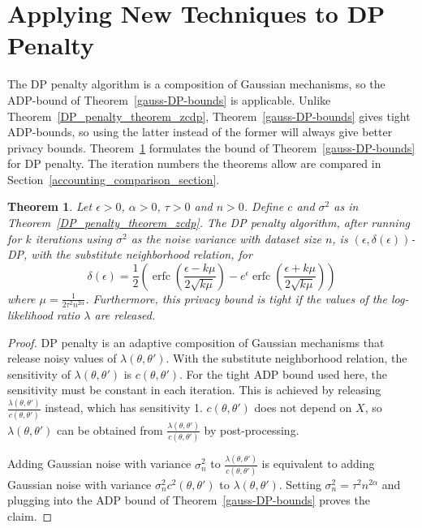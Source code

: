 \documentclass[english,twoside,openright]{HYgraduMLDS}
\newtheorem{theorem}[lemma]{Theorem}
\DeclareMathOperator{\erfc}{erfc}
\begin{document}
\section{Applying New Techniques to DP Penalty}\label{dp_penalty_adp_section}

The DP penalty algorithm is a composition of Gaussian mechanisms, so
the ADP-bound of Theorem~\ref{gauss-DP-bounds} is applicable. Unlike
Theorem~\ref{DP_penalty_theorem_zcdp}, Theorem~\ref{gauss-DP-bounds}
gives tight ADP-bounds, so using the latter instead of the former will
always give better privacy bounds. Theorem~\ref{DP_penalty_theorem_adp}
formulates the bound of Theorem~\ref{gauss-DP-bounds} for DP penalty.
The iteration numbers the theorems allow are compared in
Section~\ref{accounting_comparison_section}.

\begin{theorem}\label{DP_penalty_theorem_adp}
    Let \(\epsilon > 0\), \(\alpha > 0\), \(\tau > 0\) and \(n > 0\).
    Define \(c\) and \(\sigma^{2}\) as in Theorem~\ref{DP_penalty_theorem_zcdp}.
    The DP penalty algorithm, after running for \(k\) iterations using \(\sigma^{2}\)
    as the noise variance with dataset size \(n\),
    is \((\epsilon, \delta(\epsilon))\)-DP, with the substitute neighborhood
    relation, for
    \[
        \delta(\epsilon) 
        = \frac{1}{2}\left(
            \erfc\left(\frac{\epsilon - k\mu}{2\sqrt{k\mu}}\right)
            - e^\epsilon \erfc\left(\frac{\epsilon + k\mu}{2\sqrt{k\mu}}\right)
        \right)
    \]
    where \(\mu = \frac{1}{2\tau^2 n^{2\alpha}}\). Furthermore, this privacy
    bound is tight if the values of the log-likelihood ratio \(\lambda\) are
    released.
\end{theorem}
\begin{proof}
    DP penalty is an adaptive composition of Gaussian mechanisms that release 
    noisy values of \(\lambda(\theta, \theta')\). With the substitute neighborhood
    relation, the sensitivity of \(\lambda(\theta, \theta')\) is
    \(c(\theta, \theta')\). For the tight ADP bound used here, the sensitivity must be 
    constant in each iteration. This is achieved by releasing 
    \(\frac{\lambda(\theta, \theta')}{c(\theta, \theta')}\) instead, which 
    has sensitivity 1. \(c(\theta, \theta')\) does not depend on \(X\), 
    so \(\lambda(\theta, \theta')\) can be obtained from 
    \(\frac{\lambda(\theta, \theta')}{c(\theta, \theta')}\) by post-processing.

    Adding Gaussian noise with variance \(\sigma_n^2\) to 
    \(\frac{\lambda(\theta, \theta')}{c(\theta, \theta')}\)
    is equivalent to adding Gaussian noise with variance 
    \(\sigma_n^2 c^2(\theta, \theta')\) to \(\lambda(\theta, \theta')\).
    Setting \(\sigma_n^2 = \tau^2n^{2\alpha}\) and plugging into 
    the ADP bound of Theorem~\ref{gauss-DP-bounds} proves the 
    claim.
\end{proof}
\end{document}
